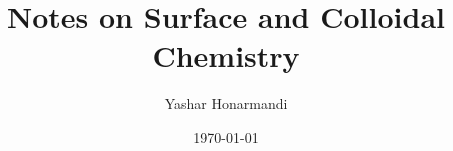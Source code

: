 \documentclass[a4paper, 11pt]{article}
\title{Notes on Surface and Colloidal Chemistry}
\author{Yashar Honarmandi}
\date{\today}
\begin{document}
\maketitle

\begin{abstract}
	
\end{abstract}

\thispagestyle{empty}

\newpage

\tableofcontents

\newpage

\end{document}
